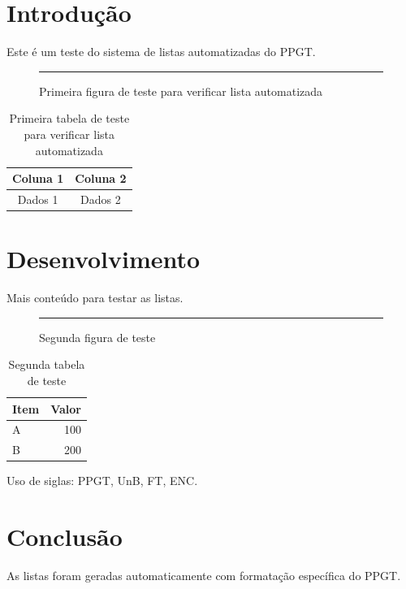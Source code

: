 \documentclass[mestrado,12pt,onehalfspacing]{UnB-PPGT}
\begin{document}

\chapter{Introdução}

Este é um teste do sistema de listas automatizadas do PPGT.

\begin{figure}[ht]
\centering
\rule{5cm}{3cm} %
\caption{Primeira figura de teste para verificar lista automatizada}
\label{fig:teste1}
\end{figure}

\begin{table}[ht]
\centering
\caption{Primeira tabela de teste para verificar lista automatizada}
\label{tab:teste1}
\begin{tabular}{|c|c|}
\hline
Coluna 1 & Coluna 2 \\
\hline
Dados 1 & Dados 2 \\
\hline
\end{tabular}
\end{table}

\chapter{Desenvolvimento}

Mais conteúdo para testar as listas.

\begin{figure}[ht]
\centering
\rule{4cm}{2cm} %
\caption{Segunda figura de teste}
\label{fig:teste2}
\end{figure}

\begin{table}[ht]
\centering
\caption{Segunda tabela de teste}
\label{tab:teste2}
\begin{tabular}{|l|r|}
\hline
Item & Valor \\
\hline
A & 100 \\
B & 200 \\
\hline
\end{tabular}
\end{table}

Uso de siglas: \gls{PPGT}, \gls{UnB}, \gls{FT}, \gls{ENC}.

\chapter{Conclusão}

As listas foram geradas automaticamente com formatação específica do PPGT.
\end{document}
